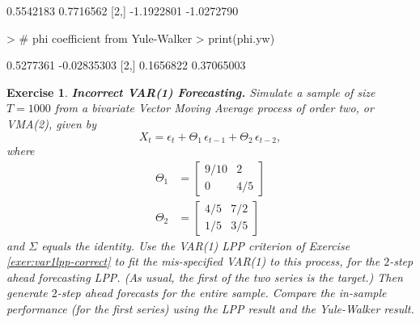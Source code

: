\documentclass[a4paper]{book}
\newtheorem{Exercise}{Exercise}
\begin{document}
\begin{Schunk}
\begin{Soutput}
           [,1]       [,2]
[1,]  0.5542183  0.7716562
[2,] -1.1922801 -1.0272790
\end{Soutput}
\begin{Sinput}
> # phi coefficient from Yule-Walker
> print(phi.yw)
\end{Sinput}
\begin{Soutput}
          [,1]        [,2]
[1,] 0.5277361 -0.02835303
[2,] 0.1656822  0.37065003
\end{Soutput}
\end{Schunk}


\begin{Exercise} {\bf Incorrect VAR(1) Forecasting.} \rm
\label{exer:var1lpp-incorrect.fore}
 Simulate a sample of size $T=1000$ from
 a bivariate Vector Moving Average process of order two, or VMA(2), given by
\[
  X_t = \epsilon_t + \Theta_1 \, \epsilon_{t-1} + \Theta_2 \, \epsilon_{t-2},
\]
  where
\begin{align*}
 \Theta_1 & = \left[ \begin{array}{cc} 9/10 & 2 \\ 0 & 4/5 \end{array} \right] \\
 \Theta_2 & = \left[ \begin{array}{cc} 4/5 & 7/2 \\ 1/5 & 3/5 \end{array} \right] 
\end{align*}
  and $\Sigma$ equals the identity.  Use the VAR(1) LPP criterion of   
 Exercise \ref{exer:var1lpp-correct}  to 
 fit the mis-specified VAR(1) to this process, for   the $2$-step ahead forecasting
 LPP.  (As usual, the first of the two series is the target.)
 Then generate $2$-step ahead forecasts for the entire sample.  Compare the in-sample 
 performance  (for the first series) using the LPP result and the Yule-Walker result.
\end{Exercise}
\end{document}
